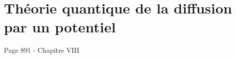 \chapter{Théorie quantique de la diffusion par un potentiel}
\label{chapter:theorie_quantique_diffusion}
Page 891 - Chapitre VIII
